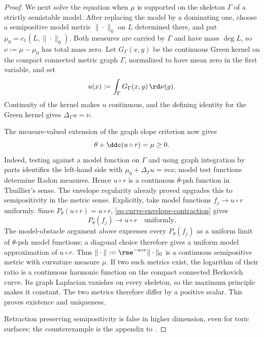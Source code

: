 \begin{proof}
We next solve the equation when $\mu$ is supported on the skeleton
$\Gamma$ of a strictly semistable model.  After replacing the model by a
dominating one, choose a semipositive model metric $\|\cdot\|_0$ on $L$
determined there, and put
$\mu_0=c_1(L,\|\cdot\|_0)$.  Both measures are carried by $\Gamma$ and
have mass $\deg L$, so $\nu:=\mu-\mu_0$ has total mass zero.  Let
$G_\Gamma(x,y)$ be the continuous Green kernel on the compact connected
metric graph $\Gamma$, normalized to have mean zero in the first variable,
and set
\[
                   u(x):=\int_\Gamma G_\Gamma(x,y)\,\rd\nu(y).
\]
Continuity of the kernel makes $u$ continuous, and the defining identity
for the Green kernel gives $\Delta_\Gamma u=\nu$.

The measure-valued extension of the graph slope criterion now gives
\[
 \theta+\ddc(u\circ r)=\mu\geq0.
\]
Indeed, testing against a model function on $\Gamma$ and using graph
integration by parts identifies the left-hand side with
$\mu_0+\Delta_\Gamma u=mu$; model test functions determine Radon
measures.  Hence $u\circ r$ is a continuous $\theta$-psh function in
Thuillier's sense.  The envelope regularity already proved upgrades this to
semipositivity in the metric sense.  Explicitly, take model functions
$f_j\to u\circ r$ uniformly.  Since $P_\theta(u\circ r)=u\circ r$,
\eqref{eq:curve-envelope-contraction} gives
\[
 P_\theta(f_j)\longrightarrow u\circ r
 \quad\text{uniformly}.
\]
The model-obstacle argument above expresses every $P_\theta(f_j)$ as a
uniform limit of $\theta$-psh model functions; a diagonal choice therefore
gives a uniform model approximation of $u\circ r$.  Thus
$\|\cdot\|:=\rme^{-u\circ r}\|\cdot\|_0$ is a continuous semipositive
metric with curvature measure $\mu$.
If two such metrics exist, the logarithm of their ratio is a continuous
harmonic function on the compact connected Berkovich curve.  Its graph
Laplacian vanishes on every skeleton, so the maximum principle makes it
constant.  The two metrics therefore differ by a positive scalar.  This
proves existence and uniqueness.

Retraction preserving semipositivity is false in higher dimension, even for
toric surfaces; the counterexample is the appendix to \cite{GJKM19}.
\end{proof}

